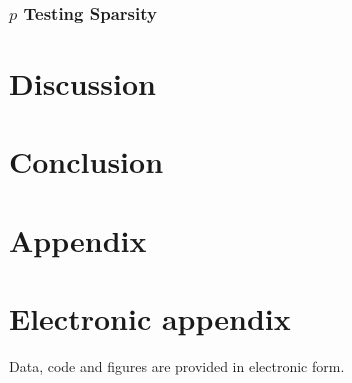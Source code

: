 \subsubsection{$p$ Testing Sparsity}

\section{Discussion}






\item \newpage
\section{Conclusion}
\label{conclusion}




\newpage

    

\setcounter{page}{5} %

\appendix

\section{Appendix}
\label{app}

\newpage

\section{Electronic appendix}
\label{el_app}

Data, code and figures are provided in electronic form.

\newpage
    

\RaggedRight


\newpage


